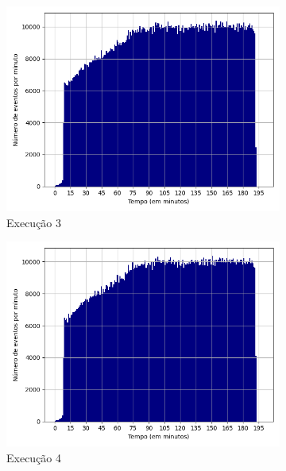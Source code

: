 \begin{figure}[p]
\begin{subfigure}{.5\textwidth}
  \centering
  \includegraphics[width=\linewidth]{figuras/graphics/histogram_vazao_8-dez-su.png} 
  \caption{Execução 3}
  \label{fig:histv-8-dez-su}
\end{subfigure}
\begin{subfigure}{.5\textwidth}
  \centering
  \includegraphics[width=\linewidth]{figuras/graphics/histogram_vazao_9-dez-su.png}  
  \caption{Execução 4}
  \label{fig:histv-9-dez-su}
\end{subfigure}
\begin{subfigure}{.5\textwidth}
  \centering

\end{subfigure}
\end{figure}

